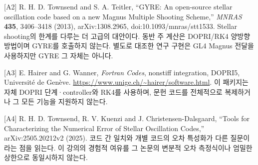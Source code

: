 \documentclass[
  10pt,
  a4paper,
]{article}
\begin{document}
{[}A2{]} R. H. D. Townsend and S. A. Teitler, ``GYRE: An open-source
stellar oscillation code based on a new Magnus Multiple Shooting
Scheme,'' \emph{MNRAS} \textbf{435}, 3406--3418 (2013), arXiv:1308.2965,
doi:10.1093/mnras/stt1533. Stellar shooting의 한계를 다루는 더 고급의
대안이다. 동반 주 계산은 DOPRI/RK4 양방향 방법이며 GYRE를 호출하지
않는다. 별도로 대조한 연구 구현은 GL4 Magnus 전달을 사용하지만 GYRE 그
자체는 아니다.

{[}A3{]} E. Hairer and G. Wanner, \emph{Fortran Codes}, nonstiff
integration, DOPRI5, Université de Genève.
\url{https://www.unige.ch/~hairer/software.html}. 이 패키지는 자체 DOPRI
단계·controller와 RK4를 사용하며, 문헌 코드를 전체적으로 복제하거나 그
모든 기능을 지원하지 않는다.

{[}A4{]} R. H. D. Townsend, R. V. Kuenzi and J. Christensen-Dalsgaard,
``Tools for Characterizing the Numerical Error of Stellar Oscillation
Codes,'' arXiv:2505.20212v2 (2025). 코드 간 일치와 개별 코드의 오차
특성화가 다른 질문이라는 점을 읽는다. 이 강의의 경험적 여유를 그 논문의
변분적 오차 측정식이나 엄밀한 상한으로 동일시하지 않는다.
\end{document}
